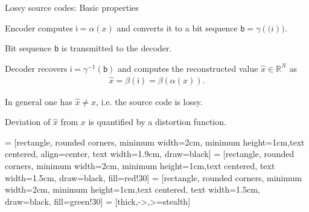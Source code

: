 \begin{frame}{Lossy source codes: Basic properties}
\bit
\item Encoder computes  $\mathsf{i}=\alpha(x)$ and converts it to a bit sequence $\mathsf{b}=\gamma(\mathsf(i))$. 
\item Bit sequence $\mathsf{b}$ is transmitted to the decoder. 
\item Decoder recovers $\mathsf{i}=\gamma^{-1}(\mathsf{b})$ and computes the reconstructed value 
$\hat{x}\in\mathbb{R}^N$ as 
\begin{align*}
\hat{x}=\beta(\mathsf{i})=\beta(\alpha(x)).
\end{align*} 
\item In general one has $\hat{x}\neq x$, i.e. the source code is lossy.  
\item Deviation of $\hat{x}$ from $x$ is quantified by a distortion function. 
\eit
\begin{center}
 = [rectangle, rounded corners, minimum width=2cm, minimum height=1cm,text centered, align=center, text width=1.9cm, draw=black]
 = [rectangle, rounded corners, minimum width=2cm, minimum height=1cm,text centered, text width=1.5cm, draw=black, fill=red!30]
 = [rectangle, rounded corners, minimum width=2cm, minimum height=1cm,text centered, text width=1.5cm, draw=black, fill=green!30]
 = [thick,->,>=stealth]
\end{center}
\end{frame}


